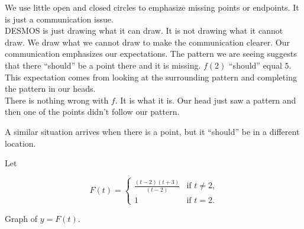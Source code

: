 \documentclass{ximera}
\begin{document}
We use little open and closed circles to emphasize missing points or endpoints.  It is just a communication issue. \\




DESMOS is just drawing what it can draw.  It is not drawing what it cannot draw. We draw what we cannot draw to make the communication clearer. Our communication emphasizes our expectations. The pattern we are seeing suggests that there ``should'' be a point there and it is missing. $f(2)$ ``should'' equal $5$.  This expectation comes from looking at the surrounding pattern and completing the pattern in our heads. \\

There is nothing wrong with $f$.  It is what it is.  Our head just saw a pattern and then one of the points didn't follow our pattern.


A similar situation arrives when there is a point, but it ``should'' be in a different location.







Let 


\[
F(t) = 
\begin{cases}
  \frac{(t-2)(t+3)}{(t-2)} &\text{if $t \ne 2$,}\\
  1 &\text{if $t = 2$}.
\end{cases}
\]




Graph of $y = F(t)$.

\begin{image}
\end{image}
\end{document}

